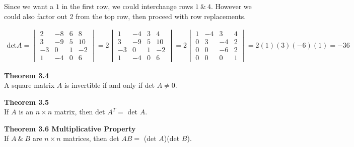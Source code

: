 \documentclass{article}
\begin{document}
  Since we want a $ 1 $ in the first row, we could interchange rows $ 1 ~\&~ 4 $. However we could also factor out 2 from the top row, then proceed with row replacements. 

  \[
    \begin{gathered}
    \text{det}A=
    \begin{vmatrix}
    2 &-8 &6 &8\\
    3 &-9 &5 &10\\
    -3 &0 &1 &-2\\
    1 &-4 &0 &6
    \end{vmatrix} =
    2\begin{vmatrix}
    1 &-4 &3 &4\\
    3 &-9 &5 &10\\
    -3 &0 &1 &-2\\
    1 &-4 &0 &6
    \end{vmatrix} = 
    2\begin{vmatrix}
    1 &-4 &3 &4\\
    0 &3 &-4 &2\\
    0 &0 &-6 &2\\
    0 &0 &0 &1
    \end{vmatrix}=2(1)(3)(-6)(1)=\boxed{-36}
    \end{gathered}
  \]

  \textbf{Theorem 3.4}\\
  A square matrix $ A $ is invertible if and only if det $ A \neq 0$.

  \textbf{Theorem 3.5}\\
  If $ A $ is an $ n \times n $ matrix, then det $ A^{T}= $ det $ A $.

  \textbf{Theorem 3.6 Multiplicative Property}\\
  If $ A ~\&~ B $ are $ n \times n $ matrices, then det $ AB = $ (det $ A $)(det $ B $).  
\end{document}
